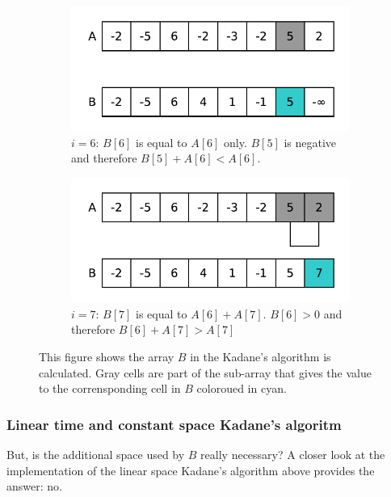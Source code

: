 \begin{figure}
	\begin{subfigure}[t]{0.48\textwidth}
		\centering
		\includegraphics[width=\textwidth]{sources/max_sum_continguous_subarray/images/kadane7}
		\caption{ $i=6$: $B[6]$ is equal to $A[6]$ only. $B[5]$ is negative and therefore $B[5]+A[6] < A[6]$.}
		\label{fig:median_sorted_array:kadane6}
	\end{subfigure}
	\hfill
	\begin{subfigure}[t]{0.48\textwidth}
		\centering
		\includegraphics[width=\textwidth]{sources/max_sum_continguous_subarray/images/kadane8}
		\caption{$i=7$: $B[7]$ is equal to $A[6]+A[7]$. $B[6] > 0$ and therefore $B[6]+A[7] > A[7]$ }
		\label{fig:median_sorted_array:kadane7}
	\end{subfigure}
	\caption[Kadane's algorithm.]{This figure shows the array $B$ in the Kadane's algorithm is calculated. Gray cells are part of the sub-array that gives the value to the corrensponding cell in $B$ coloroued in cyan. }
	\label{fig:median_sorted_array:kadane}
\end{figure}


\subsubsection{Linear time and constant space Kadane's algoritm}
But, is the additional space used by $B$ really necessary? A closer look at the implementation of the linear space Kadane's algorithm above provides the answer: no. 

